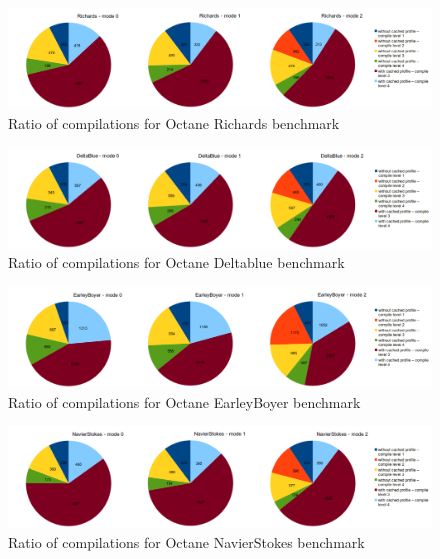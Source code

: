 \begin{figure}[ht]
  \begin{center}
    \centering
    \includegraphics[width=1.0\textwidth]{figures/richards_compilations.png}
    \caption{Ratio of compilations for Octane Richards benchmark}
    \label{f:richards_compilations}
  \end{center}
\end{figure}
\begin{figure}[ht]
  \begin{center}
    \centering
    \includegraphics[width=1.0\textwidth]{figures/deltablue_compilations.png}
    \caption{Ratio of compilations for Octane Deltablue benchmark}
    \label{f:deltablue_compilations}
  \end{center}
\end{figure}
\begin{figure}[ht]
  \begin{center}
    \centering
    \includegraphics[width=1.0\textwidth]{figures/earleyboyer_compilations.png}
    \caption{Ratio of compilations for Octane EarleyBoyer benchmark}
    \label{f:earleyboyer_compilations}
  \end{center}
\end{figure}
\begin{figure}[ht]
  \begin{center}
    \centering
    \includegraphics[width=1.0\textwidth]{figures/navierstokes_compilations.png}
    \caption{Ratio of compilations for Octane NavierStokes benchmark}
    \label{f:navierstokes_compilations}
  \end{center}
\end{figure}

